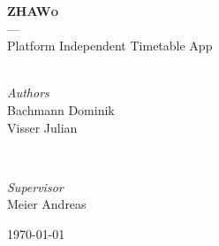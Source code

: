 \begin{titlepage}
	\textsc{\large \textbf{ZHAWo} \\[0.2cm]
									--- \\[0.3cm]}
\large{Platform Independent Timetable App}\\[0.5cm]


	\HRule\\[1cm]


	\begin{minipage}{0.4\textwidth}
		\begin{flushleft}
			\large
			\textit{Authors}\\
			Bachmann Dominik \\
			Visser Julian %
		\end{flushleft}
	\end{minipage}
	~
	\begin{minipage}{0.4\textwidth}
		\begin{flushright}
			\large
			\textit{Supervisor}\\
			Meier Andreas %
		\end{flushright}
	\end{minipage}


	\vfill
	{\large\today} %

\end{titlepage}
